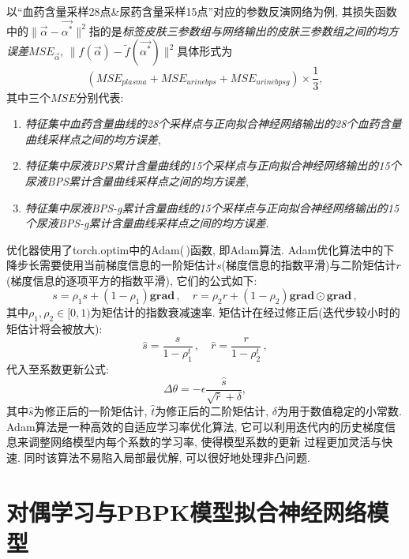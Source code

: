 \documentclass[a4paper,punct=banjiao,twoside]{ctexrep}
\theoremstyle{plain}
\theoremstyle{definition}
\theoremstyle{remark}
\begin{document}
以``血药含量采样28点\&尿药含量采样15点''对应的参数反演网络为例, 其损失函数中的$\|\vec{\alpha}-\vec{\alpha^*} \|^2$指的是\textit{标签皮肤三参数组与网络输出的皮肤三参数组之间的均方误差}$MSE_{\vec{\alpha}}$, 
$\|f(\vec{\alpha})-\tilde{f}(\vec{\alpha^*}) \|^2$具体形式为
$$
(MSE_{plasma}+MSE_{urinebps}+MSE_{urinebpsg})\times \frac{1}{3},
$$
其中三个$MSE$分别代表:
\begin{enumerate}
\item \textit{特征集中血药含量曲线的28个采样点与正向拟合神经网络输出的28个血药含量曲线采样点之间的均方误差},
\item \textit{特征集中尿液BPS累计含量曲线的15个采样点与正向拟合神经网络输出的15个尿液BPS累计含量曲线采样点之间的均方误差},
\item \textit{特征集中尿液BPS-g累计含量曲线的15个采样点与正向拟合神经网络输出的15个尿液BPS-g累计含量曲线采样点之间的均方误差}.
\end{enumerate}

优化器使用了torch.optim中的Adam(\,)函数, 即Adam算法. 
Adam优化算法中的下降步长需要使用当前梯度信息的一阶矩估计$s$(梯度信息的指数平滑)与二阶矩估计$r$\cite{24}(梯度信息的逐项平方的指数平滑), 它们的公式如下:
$$
s = \rho _1s+(1-\rho _1)\boldsymbol{grad} \, , \quad r = \rho _2r+(1-\rho _2)\boldsymbol{grad} \odot \boldsymbol{grad} \, ,
$$
其中$\rho _1, \rho _2 \in [0,1)$为矩估计的指数衰减速率.
矩估计在经过修正后(迭代步较小时的矩估计将会被放大):
$$
\hat{s}   = \frac{s}{1-\rho_1^t} \, , \quad \hat{r}   = \frac{r}{1-\rho_2^t} \, ,
$$
代入至系数更新公式:
$$
\Delta \theta   = -\epsilon \frac{\hat{s}}{\sqrt{\hat{r}} +\delta } ,
$$
其中$\hat{s}$为修正后的一阶矩估计, $\hat{t}$为修正后的二阶矩估计, $\delta$为用于数值稳定的小常数\cite{24}. 
Adam算法是一种高效的自适应学习率优化算法, 它可以利用迭代内的历史梯度信息来调整网络模型内每个系数的学习率, 使得模型系数的更新
过程更加灵活与快速\cite{24}. 同时该算法不易陷入局部最优解, 可以很好地处理非凸问题\cite{25}.





\section{对偶学习与PBPK模型拟合神经网络模型}
\label{3.5}
\end{document}
